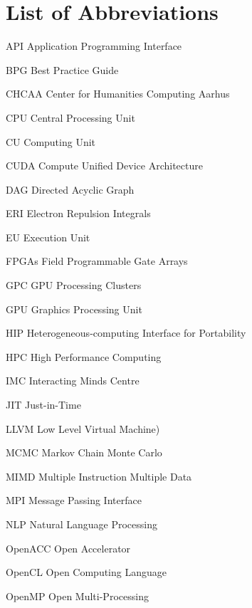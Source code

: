 \section{List of Abbreviations}


\begin{abbrv}
\item[API]                   Application Programming Interface
\item[BPG]                   Best Practice Guide
\item[CHCAA]                 Center for Humanities Computing Aarhus
\item[CPU]                   Central Processing Unit
\item[CU]                    Computing Unit
\item[CUDA]                  Compute Unified Device Architecture
\item[DAG]                   Directed Acyclic Graph
\item[ERI]                   Electron Repulsion Integrals
\item[EU]                    Execution Unit
\item[FPGAs]                 Field Programmable Gate Arrays
\item[GPC]                   GPU Processing Clusters
\item[GPU]                   Graphics Processing Unit
\item[HIP]                   Heterogeneous-computing Interface for Portability
\item[HPC]                   High Performance Computing
\item[IMC]                   Interacting Minds Centre
\item[JIT]                   Just-in-Time
\item[LLVM]                  Low Level Virtual Machine)
\item[MCMC]                  Markov Chain Monte Carlo
\item[MIMD]                  Multiple Instruction Multiple Data
\item[MPI]                   Message Passing Interface
\item[NLP]                   Natural Language Processing
\item[OpenACC]               Open Accelerator
\item[OpenCL]                Open Computing Language
\item[OpenMP]                Open Multi-Processing

\end{abbrv}
